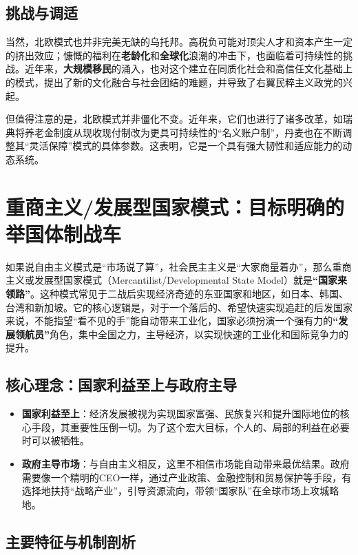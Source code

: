 \subsection{挑战与调适}

当然，北欧模式也并非完美无缺的乌托邦。高税负可能对顶尖人才和资本产生一定的挤出效应；慷慨的福利在\textbf{老龄化}和\textbf{全球化}浪潮的冲击下，也面临着可持续性的挑战。近年来，\textbf{大规模移民}的涌入，也对这个建立在同质化社会和高信任文化基础上的模式，提出了新的文化融合与社会团结的难题，并导致了右翼民粹主义政党的兴起。

但值得注意的是，北欧模式并非僵化不变。近年来，它们也进行了诸多改革，如瑞典将养老金制度从现收现付制改为更具可持续性的“名义账户制”，丹麦也在不断调整其“灵活保障”模式的具体参数。这表明，它是一个具有强大韧性和适应能力的动态系统。

\section{重商主义/发展型国家模式：目标明确的举国体制战车}

如果说自由主义模式是“市场说了算”，社会民主主义是“大家商量着办”，那么重商主义或发展型国家模式（Mercantilist/Developmental State Model）就是\textbf{“国家来领路”}。这种模式常见于二战后实现经济奇迹的东亚国家和地区，如日本、韩国、台湾和新加坡。它的核心逻辑是，对于一个落后的、希望快速实现追赶的后发国家来说，不能指望“看不见的手”能自动带来工业化，国家必须扮演一个强有力的\textbf{“发展领航员”}角色，集中全国之力，主导经济，以实现快速的工业化和国际竞争力的提升。

\subsection{核心理念：国家利益至上与政府主导}

\begin{itemize}
\item \textbf{国家利益至上}：经济发展被视为实现国家富强、民族复兴和提升国际地位的核心手段，其重要性压倒一切。为了这个宏大目标，个人的、局部的利益在必要时可以被牺牲。
\item \textbf{政府主导市场}：与自由主义相反，这里不相信市场能自动带来最优结果。政府需要像一个精明的CEO一样，通过产业政策、金融控制和贸易保护等手段，有选择地扶持“战略产业”，引导资源流向，带领“国家队”在全球市场上攻城略地。
\end{itemize}

\subsection{主要特征与机制剖析}

